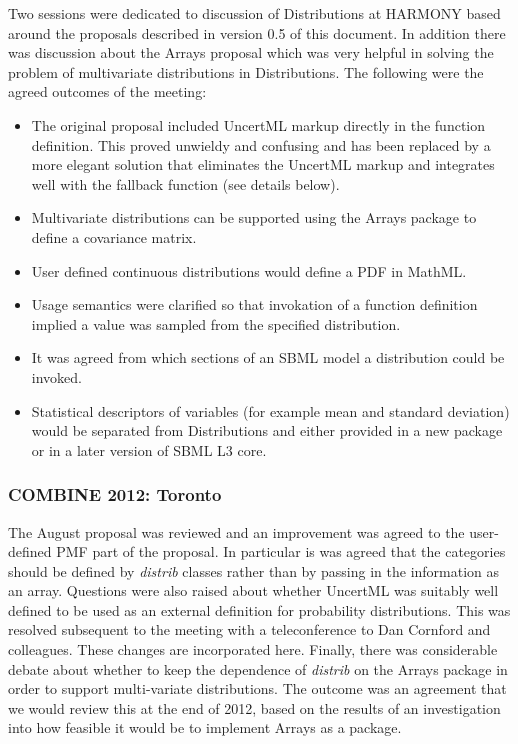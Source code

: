 \documentclass[draftspec]{sbmlpkgspec}
\newcommand{\arrays}{Arrays\xspace}
\newcommand{\distribshort}{\emph{distrib}\xspace}
\newcommand{\distrib}{Distributions\xspace}
\newcommand{\mathml}{MathML\xspace}
\newcommand{\uncertml}{UncertML\xspace}
\begin{document}
Two sessions were dedicated to discussion of \distrib at HARMONY based
around the proposals described in version 0.5 of this document. In
addition there was discussion about the \arrays proposal which was
very helpful in solving the problem of multivariate distributions in
\distrib. The following were the agreed outcomes of the meeting:

\begin{itemize}
\item The original proposal included UncertML markup directly in the
  function definition. This proved unwieldy and confusing and has been
  replaced by a more elegant solution that eliminates the UncertML
  markup and integrates well with the fallback function (see details
  below).
\item Multivariate distributions can be supported using the \arrays
  package to define a covariance matrix.
\item User defined continuous distributions would define a PDF in
  \mathml.
\item Usage semantics were clarified so that invokation of a function
  definition implied a value was sampled from the specified
  distribution.
\item It was agreed from which sections of an SBML model a
  distribution could be invoked.
\item Statistical descriptors of variables (for
  example mean and standard deviation) would be separated from
  \distrib and either provided in a new package or in a later version
  of SBML L3 core.
\end{itemize}

\subsubsection{COMBINE 2012: Toronto}

The August proposal was reviewed and an improvement was agreed to
the user-defined PMF part of the proposal. In particular is was agreed
that the categories should be defined by \distribshort classes rather
than by passing in the information as an array. Questions were also raised
about whether \uncertml was suitably well defined to be used as an
external definition for probability distributions. This was resolved
subsequent to the meeting with a teleconference to Dan Cornford and
colleagues. These changes are incorporated here. Finally, there was
considerable debate about whether to keep the dependence of
\distribshort on the Arrays package in order to support multi-variate
distributions. The outcome was an agreement that we would review this
at the end of 2012, based on the results of an investigation
into how feasible it would be to implement \arrays as a package.
\end{document}
